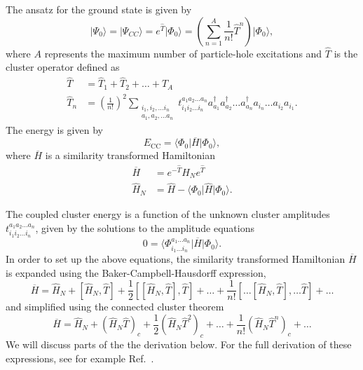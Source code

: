   The ansatz for the ground state  is given by
  \begin{equation}
     \vert \Psi_0\rangle = \vert \Psi_{CC}\rangle = e^{\hat{T}} \vert
     \Phi_0\rangle = \left( \sum_{n=1}^{A} \frac{1}{n!} \hat{T}^n
     \right) \vert \Phi_0\rangle,
  \end{equation}
  where $A$ represents the maximum number of particle-hole excitations
  and $\hat{T}$ is the cluster operator defined as
  \begin{align}
              \hat{T} &= \hat{T}_1 + \hat{T}_2 + \ldots + \hat{T}_A
              \\ \hat{T}_n &= \left(\frac{1}{n!}\right)^2
              \sum_{\substack{ i_1,i_2,\ldots i_n \\ a_1,a_2,\ldots
                  a_n}} t_{i_1i_2\ldots i_n}^{a_1a_2\ldots a_n}
              a_{a_1}^\dagger a_{a_2}^\dagger \ldots a_{a_n}^\dagger
              a_{i_n} \ldots a_{i_2} a_{i_1}.
          \end{align}
      The energy is given by
      \begin{equation}
          E_{\mathrm{CC}} = \langle\Phi_0\vert \overline{H}\vert
          \Phi_0\rangle,
      \end{equation}
      where $\overline{H}$ is a similarity transformed Hamiltonian
      \begin{align}
          \overline{H}&= e^{-\hat{T}} \hat{H}_N e^{\hat{T}}
          \\ \hat{H}_N &= \hat{H} - \langle\Phi_0\vert \hat{H} \vert
          \Phi_0\rangle.
      \end{align}

      The coupled cluster energy is a function of the unknown cluster
      amplitudes $t_{i_1i_2\ldots i_n}^{a_1a_2\ldots a_n}$, given by
      the solutions to the amplitude equations
      \begin{equation}\label{eq:amplitudeeq}
          0 = \langle\Phi_{i_1 \ldots i_n}^{a_1 \ldots a_n}\vert
          \overline{H}\vert \Phi_0\rangle.
      \end{equation}
In order to set up the above equations, 
the similarity transformed Hamiltonian $\overline{H}$ is expanded
  using the Baker-Campbell-Hausdorff expression,
      \begin{equation}\label{eq:bch}
          \overline{H}= \hat{H}_N + \left[ \hat{H}_N, \hat{T} \right]
          + \frac{1}{2} \left[\left[ \hat{H}_N, \hat{T} \right],
            \hat{T}\right] + \ldots + \frac{1}{n!} \left[
            \ldots \left[ \hat{H}_N, \hat{T} \right], \ldots \hat{T}
            \right] +\dots
      \end{equation}
  and simplified using the connected cluster theorem \cite{shavittbartlett2009}
      \begin{equation}
          \overline{H}= \hat{H}_N + \left( \hat{H}_N \hat{T}\right)_c
          + \frac{1}{2} \left( \hat{H}_N \hat{T}^2\right)_c + \dots +
          \frac{1}{n!} \left( \hat{H}_N \hat{T}^n\right)_c +\dots
      \end{equation}
We will discuss parts of the the derivation below.
For the full derivation of these expressions, see for example Ref.~\cite{shavittbartlett2009}. 

